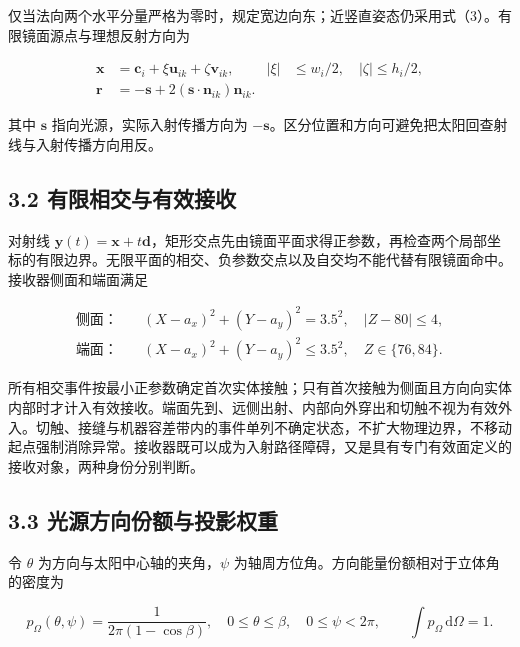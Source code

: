 \documentclass[UTF8,fontset=windows,zihao=-4]{ctexart}
\begin{document}
\par\noindent\begin{minipage}{\linewidth}
仅当法向两个水平分量严格为零时，规定宽边向东；近竖直姿态仍采用式（3）。有限镜面源点与理想反射方向为

\[
\begin{aligned}
\boldsymbol x&=\boldsymbol c_i+\xi\boldsymbol u_{ik}+\zeta\boldsymbol v_{ik},
&|\xi|&\le w_i/2,\quad |\zeta|\le h_i/2,\\
\boldsymbol r&=-\boldsymbol s+2(\boldsymbol s\cdot\boldsymbol n_{ik})\boldsymbol n_{ik}.
\end{aligned}\tag{4}
\]
\end{minipage}\par

其中 \(\boldsymbol s\) 指向光源，实际入射传播方向为 \(-\boldsymbol s\)。区分位置和方向可避免把太阳回查射线与入射传播方向用反。

\subsection*{3.2 有限相交与有效接收}

\par\noindent\begin{minipage}{\linewidth}
对射线 \(\boldsymbol y(t)=\boldsymbol x+t\boldsymbol d\)，矩形交点先由镜面平面求得正参数，再检查两个局部坐标的有限边界。无限平面的相交、负参数交点以及自交均不能代替有限镜面命中。接收器侧面和端面满足

\[
\begin{aligned}
\text{侧面：}\quad &(X-a_x)^2+(Y-a_y)^2=3.5^2,\quad |Z-80|\le4,\\
\text{端面：}\quad &(X-a_x)^2+(Y-a_y)^2\le3.5^2,\quad Z\in\{76,84\}.
\end{aligned}
\tag{5}
\]
\end{minipage}\par

所有相交事件按最小正参数确定首次实体接触；只有首次接触为侧面且方向向实体内部时才计入有效接收。端面先到、远侧出射、内部向外穿出和切触不视为有效外入。切触、接缝与机器容差带内的事件单列不确定状态，不扩大物理边界，不移动起点强制消除异常。接收器既可以成为入射路径障碍，又是具有专门有效面定义的接收对象，两种身份分别判断。

\subsection*{3.3 光源方向份额与投影权重}

\par\noindent\begin{minipage}{\linewidth}
令 \(\theta\) 为方向与太阳中心轴的夹角，\(\psi\) 为轴周方位角。方向能量份额相对于立体角的密度为

\[
p_\Omega(\theta,\psi)=\frac{1}{2\pi(1-\cos\beta)},
\quad 0\le\theta\le\beta,\quad0\le\psi<2\pi,
\qquad\int p_\Omega\,\mathrm d\Omega=1.
\tag{6}
\]
\end{minipage}\par
\end{document}
